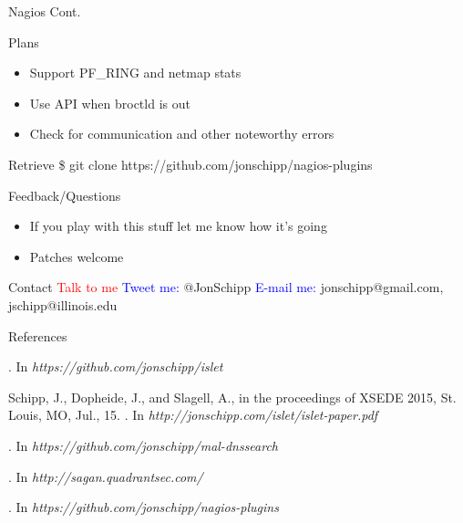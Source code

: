 \documentclass[xcolor=svgnames,handout]{beamer}
\begin{document}
\begin{frame}{Nagios Cont.}
  \begin{block}{Plans}
    \begin{itemize}
      \item Support PF\_RING and netmap stats
      \item Use API when broctld is out
      \item Check for communication and other noteworthy errors
    \end{itemize}
  \end{block}
    \begin{exampleblock}{Retrieve}
      \alert{\$ git clone https://github.com/jonschipp/nagios-plugins}
    \end{exampleblock}
\end{frame}

\begin{frame}{Feedback/Questions}
  \begin{itemize}
    \item If you play with this stuff let me know how it's going
    \item Patches welcome
  \end{itemize}
  \begin{exampleblock}{Contact}
  \textcolor{red}{Talk to me} \newline
  \textcolor{blue}{Tweet  me:} @JonSchipp \newline
  \textcolor{blue}{E-mail me:} jonschipp@gmail.com, jschipp@illinois.edu \newline
  \end{exampleblock}
\end{frame}

\begin{frame}[allowframebreaks]{References}
\begin{thebibliography}{1}

.
\newblock In {\em https://github.com/jonschipp/islet}

Schipp, J., Dopheide, J., and Slagell, A., in the proceedings of XSEDE 2015, St.  Louis, MO, Jul., 15.
.
\newblock In {\em http://jonschipp.com/islet/islet-paper.pdf}

.
\newblock In {\em https://github.com/jonschipp/mal-dnssearch}

.
\newblock In {\em http://sagan.quadrantsec.com/}

.
\newblock In {\em https://github.com/jonschipp/nagios-plugins}

\end{thebibliography}
\end{frame}
\end{document}

